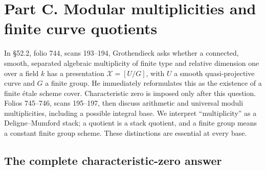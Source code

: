 \section{Part C. Modular multiplicities and finite curve quotients}

In \S52.2, folio 744, scans 193--194, Grothendieck asks whether a
connected, smooth, separated algebraic multiplicity of finite type and
relative dimension one over a field $k$ has a presentation
$\mathcal X=[U/G]$, with $U$ a smooth quasi-projective curve and $G$ a
finite group. He immediately reformulates this as the existence of a
finite \'etale scheme cover. Characteristic zero is imposed only after
this question. Folios 745--746, scans 195--197, then discuss arithmetic
and universal moduli multiplicities, including a possible integral
base. We interpret ``multiplicity'' as a Deligne--Mumford stack; a
quotient is a stack quotient, and a finite group means a constant
finite group scheme. These distinctions are essential at every base.

\subsection{The complete characteristic-zero answer}

